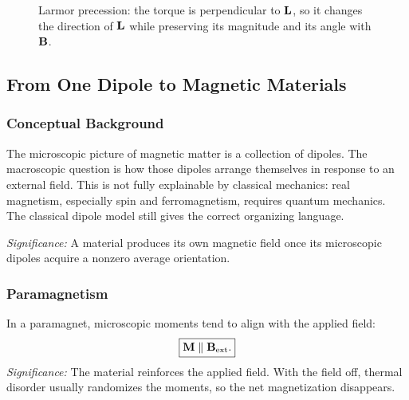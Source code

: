 \begin{figure}[h]
\centering
{}
\caption{Larmor precession: the torque is perpendicular to $\mathbf{L}$, so it changes
the direction of $\mathbf{L}$ while preserving its magnitude and its angle with $\mathbf{B}$.}
\label{fig:lec16-larmor}
\end{figure}

\subsection{From One Dipole to Magnetic Materials}\label{subsec:lec16-materials}

\subsubsection*{Conceptual Background}
The microscopic picture of magnetic matter is a collection of dipoles.  The macroscopic
question is how those dipoles arrange themselves in response to an external field.
This is not fully explainable by classical mechanics: real magnetism, especially spin
and ferromagnetism, requires quantum mechanics.  The classical dipole model still gives
the correct organizing language.


\textit{Significance:} A material produces its own magnetic field once its microscopic
dipoles acquire a nonzero average orientation.

\subsubsection*{Paramagnetism}
In a paramagnet, microscopic moments tend to align with the applied field:
\begin{equation}\label{eq:lec16-paramag}
  \boxed{\mathbf{M}\parallel \mathbf{B}_{\rm ext}.}
\end{equation}
\textit{Significance:} The material reinforces the applied field.  With the field off,
thermal disorder usually randomizes the moments, so the net magnetization disappears.


